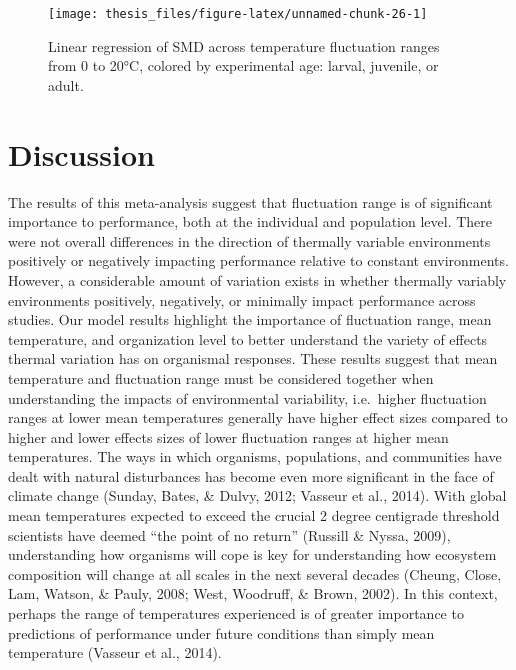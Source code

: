 \documentclass[12pt,twoside]{reedthesis}
\begin{document}
\begin{figure}

{\centering \texttt{[image: thesis\_files/figure-latex/unnamed-chunk-26-1]} 

}

\caption[Effect sizes across temperature range by experimental age]{Linear regression of SMD across temperature fluctuation ranges from 0 to 20°C, colored by experimental age: larval, juvenile, or adult.}\label{fig:unnamed-chunk-26}
\end{figure}
\hypertarget{discussion}{%
\chapter{Discussion}\label{discussion}}

The results of this meta-analysis suggest that fluctuation range is of significant importance to performance, both at the individual and population level. There were not overall differences in the direction of thermally variable environments positively or negatively impacting performance relative to constant environments. However, a considerable amount of variation exists in whether thermally variably environments positively, negatively, or minimally impact performance across studies. Our model results highlight the importance of fluctuation range, mean temperature, and organization level to better understand the variety of effects thermal variation has on organismal responses. These results suggest that mean temperature and fluctuation range must be considered together when understanding the impacts of environmental variability, i.e.~higher fluctuation ranges at lower mean temperatures generally have higher effect sizes compared to higher and lower effects sizes of lower fluctuation ranges at higher mean temperatures. The ways in which organisms, populations, and communities have dealt with natural disturbances has become even more significant in the face of climate change (Sunday, Bates, \& Dulvy, 2012; Vasseur et al., 2014). With global mean temperatures expected to exceed the crucial 2 degree centigrade threshold scientists have deemed ``the point of no return'' (Russill \& Nyssa, 2009), understanding how organisms will cope is key for understanding how ecosystem composition will change at all scales in the next several decades (Cheung, Close, Lam, Watson, \& Pauly, 2008; West, Woodruff, \& Brown, 2002). In this context, perhaps the range of temperatures experienced is of greater importance to predictions of performance under future conditions than simply mean temperature (Vasseur et al., 2014).
\end{document}

